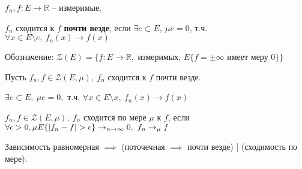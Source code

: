 \begin{definition}
    $f_n, f: E \rightarrow \mathbb{R}$ -- измеримые.

    $f_n$ сходится к $f$ \textbf{почти везде}, если $\exists e \subset E, \ \mu e = 0$, т.ч. $\forall x \in E \setminus e, \ f_n(x) \rightarrow f(x)$

    \begin{remark}
        Обозначение: $\mathcal{Z}(E) = \{ f: E \rightarrow \mathbb{R}, \text{ измеримых, } E\{ f = \pm \infty \text{  имеет меру 0} \} \}$
    \end{remark}

    Пусть $f_n, f \in \mathcal{Z}(E, \mu), \ f_n$ сходится к $f$ почти везде.

    $\exists e \subset E, \ \mu e = 0, $ т.ч. $\forall x \in E \setminus x, \ f_n(x) \rightarrow f(x)$
\end{definition}


\begin{definition}
    $f_n, f \in \mathcal{Z}(E, \mu), \ f_n$ сходится по мере $\mu$ к $f$, если $\forall \epsilon > 0, \\ \mu E \{ | f_n - f | > \epsilon \} \rightarrow_{n \rightarrow \infty} 0, \ f_n \rightarrow_{\mu} f$

    Зависимость равномерная $\implies$ (поточечная $\implies$ почти везде) | (сходимость по мере).
\end{definition}

